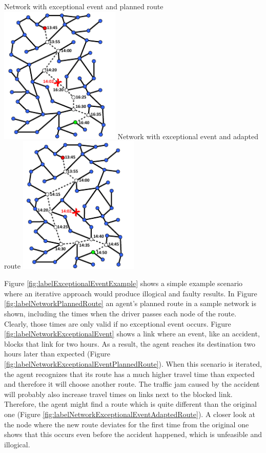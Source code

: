 {  \createsubfigure%
  {Network with exceptional event and planned route}%
  {\includegraphics[width=0.43\textwidth, angle=0]{extending/figures/WithinDayReplanning/network_original_route_with_event}}%
  {\label{fig:labelNetworkExceptionalEventPlannedRoute}}%
  {\qquad}%
  \createsubfigure%
  {Network with exceptional event and adapted route}%
  {\includegraphics[width=0.43\textwidth, angle=0]{extending/figures/WithinDayReplanning/network_adapted_route_with_event}}%
  {\label{fig:labelNetworkExceptionalEventAdaptedRoute}}%
  {}%
}%
{}

Figure \ref{fig:labelExceptionalEventExample} shows a simple example scenario where an iterative approach would produce illogical and faulty results. In Figure \ref{fig:labelNetworkPlannedRoute} an agent's planned route in a sample network is shown, including the times when the driver passes each node of the route. Clearly, those times are only valid if no exceptional event occurs. Figure \ref{fig:labelNetworkExceptionalEvent} shows a link where an event, like an accident, blocks that link for two hours. As a result, the agent reaches its destination two hours later than expected (Figure \ref{fig:labelNetworkExceptionalEventPlannedRoute}). When this scenario is iterated, the agent recognizes that its route has a much higher travel time than expected and therefore it will choose another route. The traffic jam caused by the accident will probably also increase travel times on links next to the blocked link. Therefore, the agent might find a route which is quite different than the original one (Figure \ref{fig:labelNetworkExceptionalEventAdaptedRoute}). A closer look at the node where the new route deviates for the first time from the original one shows that this occurs even before the accident happened, which is unfeasible and illogical.

